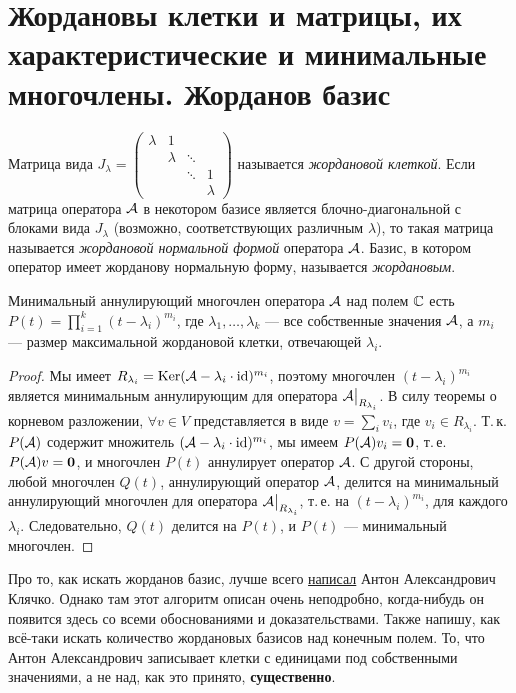 \section{Жордановы клетки и матрицы, их характеристические и минимальные многочлены. Жорданов базис}

\begin{definition}
    Матрица вида
    $
    J_\lambda =
    \begin{pmatrix}
        \lambda & 1 & & \\
         & \lambda & \ddots & \\
         & & \ddots & 1 \\
         & & & \lambda
    \end{pmatrix}
    $ называется \textit{жордановой клеткой}. Если матрица оператора $\mathcal{A}$ в некотором базисе является блочно-диагональной с блоками вида $J_\lambda$ (возможно, соответствующих различным $\lambda$), то такая матрица называется \textit{жордановой нормальной формой} оператора $\mathcal{A}$. Базис, в котором оператор имеет жорданову нормальную форму, называется \textit{жордановым}.
\end{definition}

\begin{proposal}
    Минимальный аннулирующий многочлен оператора $\mathcal{A}$ над полем $\mathbb{C}$ есть $P(t) = \prod\limits_{i = 1}^k(t - \lambda_i)^{m_i}$, где $\lambda_1, \ldots, \lambda_k$ --- все собственные значения $\mathcal{A}$, а $m_i$ --- размер максимальной жордановой клетки, отвечающей $\lambda_i$.
\end{proposal}

\begin{proof}
    Мы имеет $R_{\lambda_i} = \operatorname{Ker}(\mathcal{A} - \lambda_i \cdot \operatorname{id})^{m_i}$, поэтому многочлен $(t - \lambda_i)^{m_i}$ является минимальным аннулирующим для оператора $\mathcal{A}\big|_{R_{\lambda_i}}$. В силу теоремы о корневом разложении, $\forall v \in V$ представляется в виде $v = \sum\limits_iv_i$, где $v_i \in R_{\lambda_i}$. Т.\,к. $P(\mathcal{A})$ содержит множитель $(\mathcal{A} - \lambda_i \cdot \operatorname{id})^{m_i}$, мы имеем $P(\mathcal{A})v_i = \boldsymbol{0}$, т.\,е. $P(\mathcal{A})v = \boldsymbol{0}$, и многочлен $P(t)$ аннулирует оператор $\mathcal{A}$. С другой стороны, любой многочлен $Q(t)$, аннулирующий оператор $\mathcal{A}$, делится на минимальный аннулирующий многочлен для оператора $\mathcal{A}\big|_{R_{\lambda_i}}$, т.\,е. на $(t - \lambda_i)^{m_i}$, для каждого $\lambda_i$. Следовательно, $Q(t)$ делится на $P(t)$, и $P(t)$ --- минимальный многочлен.
\end{proof}

Про то, как искать жорданов базис, лучше всего \href{http://halgebra.math.msu.su/staff/klyachko/teaching/lin.al/JB1.PDF}{написал} Антон Александрович Клячко. Однако там этот алгоритм описан очень неподробно, когда-нибудь он появится здесь со всеми обоснованиями и доказательствами. Также напишу, как всё-таки искать количество жордановых базисов над конечным полем. То, что Антон Александрович записывает клетки с единицами под собственными значениями, а не над, как это принято, \textbf{существенно}. 

